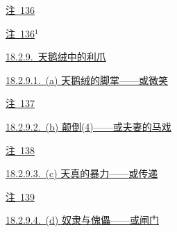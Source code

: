 \par\noindent\hspace*{4.05em}\hyperref[ch18:local:n43]{注~136}\nobreak\dotfill\nobreak\hyperref[ch18:local:n43]{\pageref*{ch18:local:n43}}\par
\par\noindent\hspace*{4.05em}\hyperref[ch18:local:n44]{注~136$^1$}\nobreak\dotfill\nobreak\hyperref[ch18:local:n44]{\pageref*{ch18:local:n44}}\par
\par\noindent\hspace*{1.35em}\hyperref[ch18:local:h48]{18.2.9.~天鹅绒中的利爪}\nobreak\dotfill\nobreak\hyperref[ch18:local:h48]{\pageref*{ch18:local:h48}}\par
\par\noindent\hspace*{2.70em}\hyperref[ch18:local:h49]{18.2.9.1.~(a) 天鹅绒的脚掌——或微笑}\nobreak\dotfill\nobreak\hyperref[ch18:local:h49]{\pageref*{ch18:local:h49}}\par
\par\noindent\hspace*{4.05em}\hyperref[ch18:local:n45]{注~137}\nobreak\dotfill\nobreak\hyperref[ch18:local:n45]{\pageref*{ch18:local:n45}}\par
\par\noindent\hspace*{2.70em}\hyperref[ch18:local:h50]{18.2.9.2.~(b) 颠倒(4)——或夫妻的马戏}\nobreak\dotfill\nobreak\hyperref[ch18:local:h50]{\pageref*{ch18:local:h50}}\par
\par\noindent\hspace*{4.05em}\hyperref[ch18:local:n46]{注~138}\nobreak\dotfill\nobreak\hyperref[ch18:local:n46]{\pageref*{ch18:local:n46}}\par
\par\noindent\hspace*{2.70em}\hyperref[ch18:local:h51]{18.2.9.3.~(c) 天真的暴力——或传递}\nobreak\dotfill\nobreak\hyperref[ch18:local:h51]{\pageref*{ch18:local:h51}}\par
\par\noindent\hspace*{4.05em}\hyperref[ch18:local:n47]{注~139}\nobreak\dotfill\nobreak\hyperref[ch18:local:n47]{\pageref*{ch18:local:n47}}\par
\par\noindent\hspace*{2.70em}\hyperref[ch18:local:h52]{18.2.9.4.~(d) 奴隶与傀儡——或闸门}\nobreak\dotfill\nobreak\hyperref[ch18:local:h52]{\pageref*{ch18:local:h52}}\par
